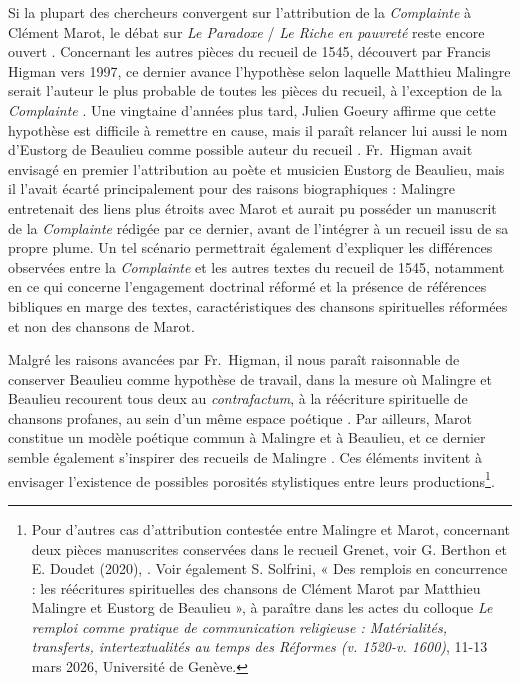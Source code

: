 \documentclass[final, fra]{anthology-ch}
\begin{document}
Si la plupart des chercheurs convergent sur l'attribution de la \textit{Complainte} à Clément Marot, le débat sur \textit{Le Paradoxe} / \textit{Le Riche en pauvreté} reste encore ouvert \cite{higman2023, defaux2014marot2, screech1994marot}.
Concernant les autres pièces du recueil de 1545, découvert par Francis Higman vers 1997, ce dernier avance l’hypothèse selon laquelle Matthieu Malingre serait l’auteur le plus probable de toutes les pièces du recueil, à l’exception de la \textit{Complainte} \cite{higman_piety_2016,higman2023}. Une vingtaine d'années plus tard, Julien Goeury affirme que cette hypothèse est difficile à remettre en cause, mais il paraît relancer lui aussi le nom d'Eustorg de Beaulieu comme possible auteur du recueil \cite{goeury2016muse}.
Fr.~Higman avait envisagé en premier l'attribution au poète et musicien Eustorg de Beaulieu, mais il l’avait écarté principalement pour des raisons biographiques : Malingre entretenait des liens plus étroits avec Marot et aurait pu posséder un manuscrit de la \textit{Complainte} rédigée par ce dernier, avant de l’intégrer à un recueil issu de sa propre plume. 
Un tel scénario permettrait également d’expliquer les différences observées entre la \textit{Complainte} et les autres textes du recueil de 1545, notamment en ce qui concerne l’engagement doctrinal réformé et la présence de références bibliques en marge des textes, caractéristiques des chansons spirituelles réformées et non des chansons de Marot.

Malgré les raisons avancées par Fr.~Higman, il nous paraît raisonnable de conserver Beaulieu comme hypothèse de travail, dans la mesure où Malingre et Beaulieu recourent tous deux au \textit{contrafactum}, à la réécriture spirituelle de chansons profanes, au sein d'un même espace poétique \cite{ferrer2012chanson, ullberg2005salvation, vignes_introduction_2022}. Par ailleurs, Marot constitue un modèle poétique commun à Malingre et à Beaulieu, et ce dernier semble également s’inspirer des recueils de Malingre \cite{baranova2019}. Ces éléments invitent à envisager l’existence de possibles porosités stylistiques entre leurs productions\footnote{Pour d’autres cas d’attribution contestée entre Malingre et Marot, concernant deux pièces manuscrites conservées dans le recueil Grenet, voir G. Berthon et E. Doudet (2020), \cite{berthon_doudet_recueil_2020}. Voir également S. Solfrini, « Des remplois en concurrence : les réécritures spirituelles des chansons de Clément Marot par Matthieu Malingre et Eustorg de Beaulieu », à paraître dans les actes du colloque \textit{Le remploi comme pratique de communication religieuse : Matérialités, transferts, intertextualités au temps des Réformes (v. 1520-v. 1600)}, 11-13 mars 2026, Université de Genève.}.
\end{document}
